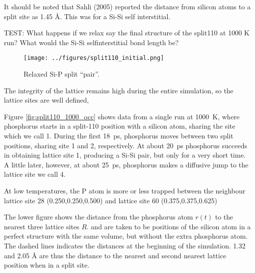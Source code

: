 \documentclass[11pt,bibliography=totoc,index=totoc]{scrbook}   %
\begin{document}
It should be noted that Sahli (2005) reported the distance from silicon atoms to a split site as 1.45 Å. 
This was for a Si-Si self interstitial.

TEST: What happens if we relax say the final structure of the split110 at 1000 K run? What would the Si-Si selfinterstitial bond length be?

\begin{figure}[htp]
  \centering
  \texttt{[image: ../figures/split110\_initial.png]}
  \caption{Relaxed Si-P split ``pair''.}
  \label{fig:relaxedSIPsplit}
\end{figure}



   


The integrity of the lattice remains high during the entire simulation, so the lattice sites are well defined,

Figure \ref{fig:split110_1000_occ} shows data from a single run at 1000~K,
where phosphorus starts in a split-110 position with a silicon atom, sharing the site which we call 1. During the first 18~ps, phosphorus moves between two split positions, sharing site 1 and 2, respectively. At about 20~ps phosphorus succeeds in obtaining lattice site 1, producing a Si-Si pair, but only for a very short time. A little later, however, at about 25~ps, phosphorus makes a diffusive jump to the lattice site we call 4. 

At low temperatures, the P atom is more or less trapped between the neighbour lattice site 28 (0.250,0.250,0.500) and lattice site 60 (0.375,0.375,0.625)

  The lower figure shows the distance from the phosphorus atom $r(t)$ to the nearest three lattice sites $R$.
  and are taken to be positions of the silicon atom in a perfect structure with the same volume, but without the extra phosphorus atom.
  The dashed lines indicates the distances at the beginning of the simulation. 1.32 and 2.05 Å are thus the distance to the nearest
  and second nearest lattice position when in a split site.
\end{document}
